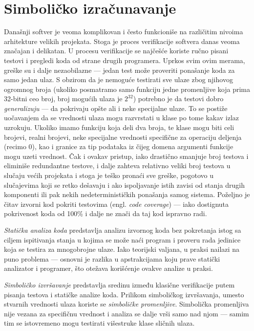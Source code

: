 \section{Simboličko izračunavanje}
\label{sec:Symbolics}

Današnji softver je veoma komplikovan i često funkcioniše na različitim nivoima arhitekture velikih projekata. Stoga je proces verifikacije softvera danas veoma značajan i delikatan. U procesu verifikacije se najčešće koriste ručno pisani testovi i pregledi koda od strane drugih programera. Uprkos svim ovim merama, greške su i dalje nezaobilazne --- jedan test može proveriti ponašanje koda za samo jedan ulaz. S obzirom da je nemoguće testirati sve ulaze zbog njihovog ogromnog broja (ukoliko posmatramo samo funkciju jedne promenljive koja prima 32-bitni ceo broj, broj mogućih ulaza je $2^{32}$) potrebno je da testovi dobro \emph{generalizuju} --- da pokrivaju opšte ali i neke specijalne ulaze. To se postiže uočavanjem da se vrednosti ulaza mogu razvrstati u klase po tome kakav izlaz uzrokuju. Ukoliko imamo funkciju koja deli dva broja, te klase mogu biti celi brojevi, realni brojevi, neke specijalne vrednosti specifične za operaciju deljenja (recimo $0$), kao i granice za tip podataka iz čijeg domena argumenti funkcije mogu uzeti vrednost. Čak i ovakav pristup, iako drastično smanjuje broj testova i eliminiše redundantne testove, i dalje zahteva relativno veliki broj testova u slučaju većih projekata i stoga je teško pronaći sve greške, pogotovo u slučajevima koji se retko dešavaju i ako ispoljavanje istih zavisi od stanja drugih komponenti ili pak nekih nedeterminističkih ponašanja samog sistema. Poželjno je čitav izvorni kod pokriti  testovima (engl. \emph{code coverage}) --- iako dostignuta pokrivenost koda od 100\% i dalje ne znači da taj kod ispravno radi.

\emph{Statička analiza koda} predstavlja analizu izvornog koda bez pokretanja istog sa ciljem ispitivanja stanja u kojima se može naći program i proveru rada jedinice koja se testira za mnogobrojne ulaze. Iako teorijski valjana, u praksi nailazi na puno problema --- osnovni je razlika u apstrakcijama koju prave statički analizator i programer, što otežava korišćenje ovakve analize u praksi.

\emph{Simboličko izvršavanje} \cite{SymbolicExecution} predstavlja sredinu između klasične verifikacije putem pisanja testova i statičke analize koda. Prilikom simboličkog izvršavanja, umesto stvarnih vrednosti ulaza koriste se \emph{simboličke promenljive}. Simbolička promenljiva nije vezana za specifičnu vrednost i analiza se dalje vrši samo nad njom --- samim tim se istovremeno mogu testirati višestruke klase sličnih ulaza. 

